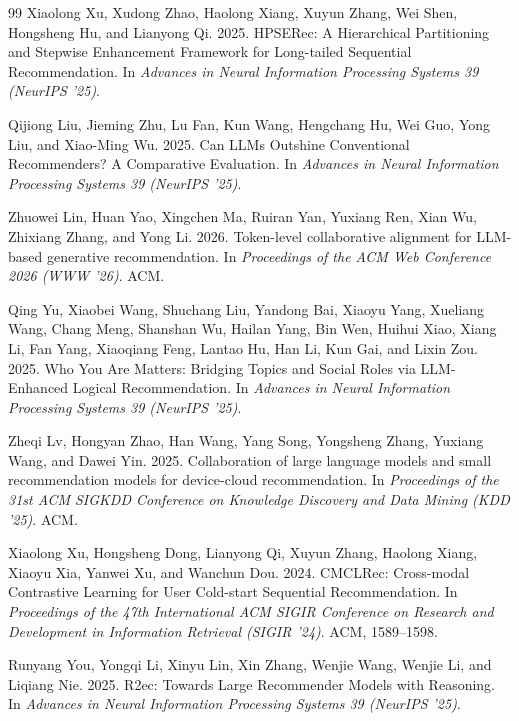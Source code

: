 ﻿\documentclass{article}
\begin{document}
\begin{thebibliography}{99}
Xiaolong Xu, Xudong Zhao, Haolong Xiang, Xuyun Zhang, Wei Shen, Hongsheng Hu, and Lianyong Qi. 2025.
HPSERec: A Hierarchical Partitioning and Stepwise Enhancement Framework for Long-tailed Sequential Recommendation.
In \textit{Advances in Neural Information Processing Systems 39 (NeurIPS '25)}.

Qijiong Liu, Jieming Zhu, Lu Fan, Kun Wang, Hengchang Hu, Wei Guo, Yong Liu, and Xiao-Ming Wu. 2025.
Can LLMs Outshine Conventional Recommenders? A Comparative Evaluation.
In \textit{Advances in Neural Information Processing Systems 39 (NeurIPS '25)}.

Zhuowei Lin, Huan Yao, Xingchen Ma, Ruiran Yan, Yuxiang Ren, Xian Wu, Zhixiang Zhang, and Yong Li. 2026.
Token-level collaborative alignment for LLM-based generative recommendation.
In \textit{Proceedings of the ACM Web Conference 2026 (WWW '26)}. ACM.

Qing Yu, Xiaobei Wang, Shuchang Liu, Yandong Bai, Xiaoyu Yang, Xueliang Wang, Chang Meng, Shanshan Wu, Hailan Yang, Bin Wen, Huihui Xiao, Xiang Li, Fan Yang, Xiaoqiang Feng, Lantao Hu, Han Li, Kun Gai, and Lixin Zou. 2025.
Who You Are Matters: Bridging Topics and Social Roles via LLM-Enhanced Logical Recommendation.
In \textit{Advances in Neural Information Processing Systems 39 (NeurIPS '25)}.

Zheqi Lv, Hongyan Zhao, Han Wang, Yang Song, Yongsheng Zhang, Yuxiang Wang, and Dawei Yin. 2025.
Collaboration of large language models and small recommendation models for device-cloud recommendation.
In \textit{Proceedings of the 31st ACM SIGKDD Conference on Knowledge Discovery and Data Mining (KDD '25)}. ACM.

Xiaolong Xu, Hongsheng Dong, Lianyong Qi, Xuyun Zhang, Haolong Xiang, Xiaoyu Xia, Yanwei Xu, and Wanchun Dou. 2024.
CMCLRec: Cross-modal Contrastive Learning for User Cold-start Sequential Recommendation.
In \textit{Proceedings of the 47th International ACM SIGIR Conference on Research and Development in Information Retrieval (SIGIR '24)}. ACM, 1589--1598.

Runyang You, Yongqi Li, Xinyu Lin, Xin Zhang, Wenjie Wang, Wenjie Li, and Liqiang Nie. 2025.
R2ec: Towards Large Recommender Models with Reasoning.
In \textit{Advances in Neural Information Processing Systems 39 (NeurIPS '25)}.


\end{thebibliography}
\end{document}
